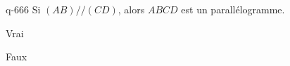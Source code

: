 \begin{truefalse}{q-666}
Si $(AB)//(CD)$, alors $ABCD$ est un parallélogramme.
\item Vrai
\item* Faux
\end{truefalse}

